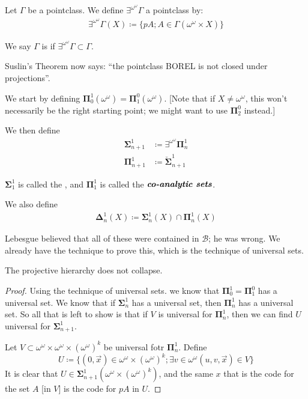 \documentclass[]{article}
\newcommand{\om}{\omega}
\newcommand{\bosig}{\bm{\Sigma}}
\newcommand{\bopi}{\bm{\Pi}}
\newcommand{\bodel}{\bm{\Delta}}
\newcommand{\eomg}{\exists^{\om^\om}\Gamma}
\newcommand{\eom}{\exists^{\om^\om}}
\begin{document}
\begin{defin*}
    Let $\Gamma$ be a pointclass. We define $\exists^{\om^\om} \Gamma$ a pointclass by:
    \begin{align*}
        \exists^{\om^\om}\Gamma(X) \coloneqq \{pA; A \in \Gamma(\om^\om\times X)\}
    \end{align*}

    We say $\Gamma$ is  if $\eomg \subset \Gamma$.
\end{defin*}

Suslin's Theorem now says: ``the pointclass BOREL is not closed under projections''.

\begin{defin*}
    We start by defining $\bopi_0^1(\om^\om) = \bopi_1^0(\om^\om)$. [Note that if $X \ne \om^\om$, this won't necessarily be the right starting point; we might want to use $\bopi^0_2$ instead.]

    We then define 
    \begin{align*}
        \bosig_{n+1}^1 &\coloneqq \eom \bopi_n^1\\
        \bopi_{n+1}^1 &\coloneqq \breve{\bosig}_{n+1}^1
    \end{align*}

    $\bosig_1^1$ is called the , and $\bopi_1^1$ is called the $\textit{\textbf{co-analytic sets}}$.

    We also define
    \begin{align*}
        \bodel_n^1(X) \coloneqq \bosig_n^1 (X) \cap \bopi_n^1(X)
    \end{align*}
\end{defin*}

Lebesgue believed that all of these were contained in $\mathcal{B}$; he was wrong. We already have the technique to prove this, which is the technique of universal sets.

\begin{theorem*}
    The projective hierarchy does not collapse.
\end{theorem*}
\begin{proof}
    Using the technique of universal sets. we know that $\bopi_0^1 = \bopi_1^0$ has a universal set. We know that if $\bosig_n^1$ has a universal set, then $\bopi_n^1$ has a universal set. So all that is left to show is that if $V$ is universal for $\bopi_n^1$, then we can find $U$ universal for $\bosig_{n+1}^1$.

    Let $V\subset \om^\om \times \om^\om \times (\om^\om)^k$ be universal fotr $\bopi_n^1$. Define $$U \coloneqq \{(0,\vec{x})\in \om^\om \times (\om^\om)^k; \exists v \in \om^\om (u,v,\vec{x}) \in V\}$$
    It is clear that $U \in \bosig_{n+1}^1(\om^\om \times (\om^\om)^k)$, and the same $x$ that is the code for the set $A$ [in $V$] is the code for $pA$ in $U$.
\end{proof}
\end{document}
